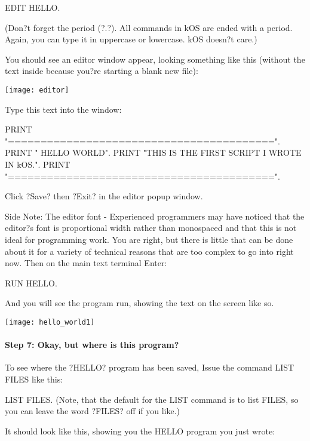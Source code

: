 \begin{framed}EDIT HELLO.
\end{framed}

(Don?t forget the period (?.?). All commands in kOS are ended with a period. Again, you can type it in uppercase or lowercase. kOS doesn?t care.)

You should see an editor window appear, looking something like this (without the text inside because you?re starting a blank new file):

\begin{center}
\texttt{[image: editor]}
\end{center}

Type this text into the window:

\begin{framed}PRINT "=========================================".
PRINT "      HELLO WORLD".
PRINT "THIS IS THE FIRST SCRIPT I WROTE IN kOS.".
PRINT "=========================================".
\end{framed}

Click ?Save? then ?Exit? in the editor popup window.

Side Note: The editor font - Experienced programmers may have noticed that the editor?s font is proportional width rather than monospaced and that this is not ideal for programming work. You are right, but there is little that can be done about it for a variety of technical reasons that are too complex to go into right now.
Then on the main text terminal Enter:

\begin{framed}
RUN HELLO.
\end{framed}

And you will see the program run, showing the text on the screen like so.

\begin{center}
\texttt{[image: hello\_world1]}
\end{center}

\paragraph{Step 7: Okay, but where is this program?}
To see where the ?HELLO? program has been saved, Issue the command LIST FILES like this:

LIST FILES.
(Note, that the default for the LIST command is to list FILES, so you can leave the word ?FILES? off if you like.)

It should look like this, showing you the HELLO program you just wrote:

